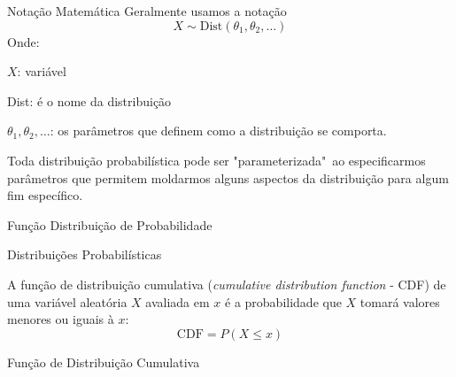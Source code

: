 \begin{frame}{Notação Matemática}
    Geralmente usamos a notação
    $$X \sim \text{Dist}(\theta_1, \theta_2, \dots)$$
    Onde:
    \begin{vfilleditems}
        \item $X$: variável
        \item Dist: é o nome da distribuição
        \item $\theta_1, \theta_2, \dots$: os parâmetros que definem como a distribuição se comporta.
    \end{vfilleditems}
    Toda distribuição probabilística pode ser "parameterizada"~ao especificarmos parâmetros que permitem moldarmos alguns aspectos da distribuição para algum fim específico.
\end{frame}

\begin{frame}{Função Distribuição de Probabilidade}
    \centering
\end{frame}

\begin{frame}{Distribuições Probabilísticas}
    \begin{defn}
        A função de distribuição cumulativa (\textit{cumulative distribution function} - CDF)
        de uma variável aleatória $X$ avaliada em $x$ é a probabilidade que $X$ tomará
        valores menores ou iguais à $x$:
        $$\text{CDF} = P(X \leq x)$$
    \end{defn}
\end{frame}

\begin{frame}{Função de Distribuição Cumulativa}
    \centering
\end{frame}

